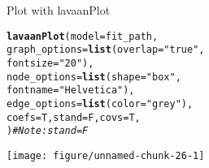 \documentclass[10pt]{beamer}\usepackage[]{graphicx}\usepackage[]{xcolor}
\makeatletter
\newcommand{\hlsng}[1]{\textcolor[rgb]{0.192,0.494,0.8}{#1}}%
\newcommand{\hlcom}[1]{\textcolor[rgb]{0.678,0.584,0.686}{\textit{#1}}}%
\newcommand{\hldef}[1]{\textcolor[rgb]{0.345,0.345,0.345}{#1}}%
\newcommand{\hlkwc}[1]{\textcolor[rgb]{0.333,0.667,0.333}{#1}}%
\newcommand{\hlkwd}[1]{\textcolor[rgb]{0.737,0.353,0.396}{\textbf{#1}}}%
\newenvironment{kframe}{%
 \def\at@end@of@kframe{}%
 \ifinner\ifhmode%
  \def\at@end@of@kframe{\end{minipage}}%
  \begin{minipage}{\columnwidth}%
 \fi\fi%
 \def\FrameCommand##1{\hskip\@totalleftmargin \hskip-\fboxsep
 \colorbox{shadecolor}{##1}\hskip-\fboxsep
     \hskip-\linewidth \hskip-\@totalleftmargin \hskip\columnwidth}%
 \MakeFramed {\advance\hsize-\width
   \@totalleftmargin\z@ \linewidth\hsize
   \@setminipage}}%
 {\par\unskip\endMakeFramed%
 \at@end@of@kframe}
\newenvironment{knitrout}{}{} %
\makeatother
\begin{document}
\begin{frame}[fragile]{Plot with lavaanPlot}
\begin{knitrout}
\color{fgcolor}\begin{kframe}
\begin{alltt}
  \hlkwd{lavaanPlot}\hldef{(}\hlkwc{model} \hldef{= fit_path,}
           \hlkwc{graph_options} \hldef{=} \hlkwd{list}\hldef{(}\hlkwc{overlap} \hldef{=} \hlsng{"true"}\hldef{,}
                                \hlkwc{fontsize} \hldef{=} \hlsng{"20"}\hldef{),}
           \hlkwc{node_options} \hldef{=} \hlkwd{list}\hldef{(}\hlkwc{shape} \hldef{=} \hlsng{"box"}\hldef{,}
                               \hlkwc{fontname} \hldef{=} \hlsng{"Helvetica"}\hldef{),}
           \hlkwc{edge_options} \hldef{=} \hlkwd{list}\hldef{(}\hlkwc{color} \hldef{=} \hlsng{"grey"}\hldef{),}
           \hlkwc{coefs} \hldef{= T,} \hlkwc{stand} \hldef{= F,} \hlkwc{covs} \hldef{= T,}
           \hldef{)} \hlcom{# Note: stand = F}
\end{alltt}
\end{kframe}
\texttt{[image: figure/unnamed-chunk-26-1]} 
\end{knitrout}
\end{frame}
%
\end{document}
